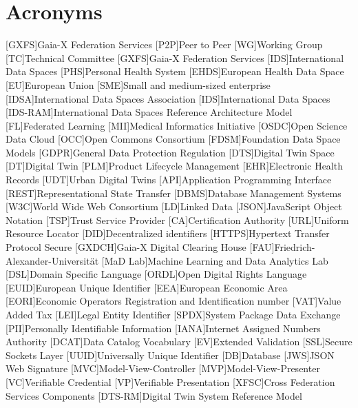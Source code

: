 \chapter{Acronyms}
\begin{acronym}
    [GXFS]{Gaia-X Federation Services}
    [P2P]{Peer to Peer}
    [WG]{Working Group}
    [TC]{Technical Committee}
    [GXFS]{Gaia-X Federation Services}
    [IDS]{International Data Spaces}
    [PHS]{Personal Health System}
    [EHDS]{European Health Data Space}
    [EU]{European Union}
    [SME]{Small and medium-sized enterprise}
    [IDSA]{International Data Spaces Association}
    [IDS]{International Data Spaces}
    [IDS-RAM]{International Data Spaces Reference Architecture Model}
    [FL]{Federated Learning}
    [MII]{Medical Informatics Initiative}
    [OSDC]{Open Science Data Cloud}
    [OCC]{Open Commons Consortium}
    [FDSM]{Foundation Data Space Models}
    [GDPR]{General Data Protection Regulation}
    [DTS]{Digital Twin Space}
    [DT]{Digital Twin}
    [PLM]{Product Lifecycle Management}
    [EHR]{Electronic Health Records}
    [UDT]{Urban Digital Twins}
    [API]{Application Programming Interface}
    [REST]{Representational State Transfer}
    [DBMS]{Database Management Systems}
    [W3C]{World Wide Web Consortium}
    [LD]{Linked Data}
    [JSON]{JavaScript Object Notation}
    [TSP]{Trust Service Provider}
    [CA]{Certification Authority}
    [URL]{Uniform Resource Locator}
    [DID]{Decentralized identifiers}
    [HTTPS]{Hypertext Transfer Protocol Secure}
    [GXDCH]{Gaia-X Digital Clearing House}
    [FAU]{Friedrich-Alexander-Universität}
    [MaD Lab]{Machine Learning and Data Analytics Lab}
    [DSL]{Domain Specific Language}
    [ORDL]{Open Digital Rights Language}
    [EUID]{European Unique Identifier}
    [EEA]{European Economic Area}
    [EORI]{Economic Operators Registration and Identification number}
    [VAT]{Value Added Tax}
    [LEI]{Legal Entity Identifier}
    [SPDX]{System Package Data Exchange}
    [PII]{Personally Identifiable Information}
    [IANA]{Internet Assigned Numbers Authority}
    [DCAT]{Data Catalog Vocabulary}
    [EV]{Extended Validation}
    [SSL]{Secure Sockets Layer}
    [UUID]{Universally Unique Identifier}
    [DB]{Database}
    [JWS]{JSON Web Signature}
    [MVC]{Model-View-Controller}
    [MVP]{Model-View-Presenter}
    [VC]{Verifiable Credential}
    [VP]{Verifiable Presentation}
    [XFSC]{Cross Federation Services Components}
    [DTS-RM]{Digital Twin System Reference Model}
\end{acronym}%
